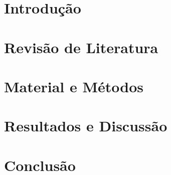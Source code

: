 \documentclass[
	12pt,				%
	openright,			%
	oneside,			%
	a4paper,			%
	brazil				%
	]{abntex2}
\begin{document}
\tableofcontents*
\cleardoublepage



\textual

\setcounter{page}{1}

\chapter{Introdução}


\chapter{Revisão de Literatura}


\chapter{Material e Métodos}


\chapter{Resultados e Discussão}


\chapter{Conclusão}






\postextual

\end{document}
